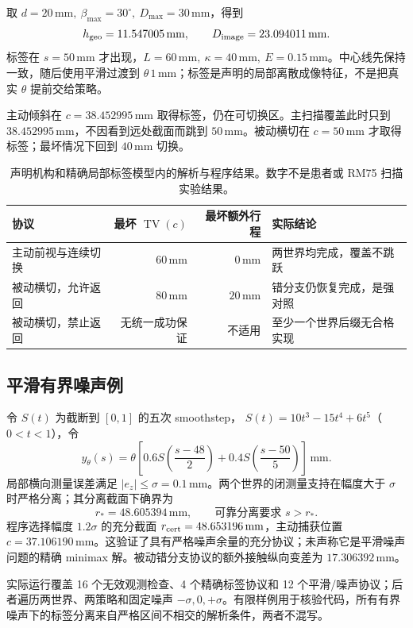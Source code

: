 \documentclass[11pt,a4paper]{article}
\theoremstyle{cn}
\newcommand{\mm}{\,\mathrm{mm}}
\newcommand{\TV}{\operatorname{TV}}
\begin{document}
取 \(d=20\mm,\ \beta_{\max}=30^\circ,\ D_{\max}=30\mm\)，得到
\[
h_{\rm geo}=11.547005\mm,\qquad D_{\rm image}=23.094011\mm.
\]
标签在 \(s=50\mm\) 才出现，\(L=60\mm,\ \kappa=40\mm,\ E=0.15\mm\)。中心线先保持一致，随后使用平滑过渡到 \(\theta\,1\mm\)；标签是声明的局部离散成像特征，不是把真实 \(\theta\) 提前交给策略。

主动倾斜在 \(c=38.452995\mm\) 取得标签，仍在可切换区。主扫描覆盖此时只到 \(38.452995\mm\)，不因看到远处截面而跳到 \(50\mm\)。被动横切在 \(c=50\mm\) 才取得标签；最坏情况下回到 \(40\mm\) 切换。

\begin{table}[htbp]
\centering\small
\begin{tabularx}{\linewidth}{@{}lrrX@{}}
\toprule
协议 & 最坏 \(\TV(c)\) & 最坏额外行程 & 实际结论\\
\midrule
主动前视与连续切换 & \(60\mm\) & \(0\mm\) & 两世界均完成，覆盖不跳跃\\
被动横切，允许返回 & \(80\mm\) & \(20\mm\) & 错分支仍恢复完成，是强对照\\
被动横切，禁止返回 & 无统一成功保证 & 不适用 & 至少一个世界后缀无合格实现\\
\bottomrule
\end{tabularx}
\caption{声明机构和精确局部标签模型内的解析与程序结果。数字不是患者或 RM75 扫描实验结果。}
\end{table}

\subsection{平滑有界噪声例}

令 \(S(t)\) 为截断到 \([0,1]\) 的五次 smoothstep，
\(S(t)=10t^3-15t^4+6t^5\)（\(0<t<1\)），令
\begin{equation}
y_\theta(s)=\theta\left[
0.6S\!\left(\frac{s-48}{2}\right)
+0.4S\!\left(\frac{s-50}{5}\right)\right]\mm .
\label{eq:smooth}
\end{equation}
局部横向测量误差满足 \(|e_z|\le\sigma=0.1\mm\)。两个世界的闭测量支持在幅度大于 \(\sigma\) 时严格分离；其分离截面下确界为
\[
r_*=48.605394\mm,\qquad \text{可靠分离要求 }s>r_*.
\]
程序选择幅度 \(1.2\sigma\) 的充分截面
\(r_{\rm cert}=48.653196\mm\)，主动捕获位置
\(c=37.106190\mm\)。这验证了具有严格噪声余量的充分协议；未声称它是平滑噪声问题的精确 minimax 解。被动错分支协议的额外接触纵向变差为 \(17.306392\mm\)。

实际运行覆盖 16 个无效观测检查、4 个精确标签协议和 12 个平滑/噪声协议；后者遍历两世界、两策略和固定噪声 \(-\sigma,0,+\sigma\)。有限样例用于核验代码，所有有界噪声下的标签分离来自严格区间不相交的解析条件，两者不混写。
\end{document}
